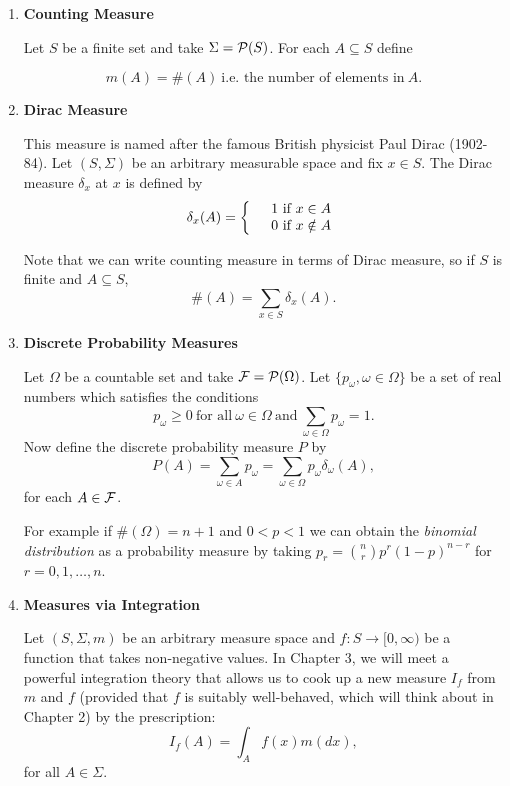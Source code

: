 \documentclass[a4paper]{report}
\numberwithin{equation}{chapter}
\numberwithin{thm_counter}{section}
\begin{document}
\begin{enumerate}

\item {\bf Counting Measure}

 

Let $S$ be a finite set and take $\Sigma = {\cal P}(S)$. For each $A \subseteq S$ define

$$ m(A) = \#(A)~\mbox{i.e. the number of elements in}~A.$$

 

\item  {\bf Dirac Measure}

 

This measure is named after the famous British physicist Paul Dirac (1902-84). Let $(S, \Sigma)$ be an arbitrary measurable space and fix $x \in S$. The Dirac measure $\delta_{x}$ at $x$ is defined by
$$ \delta_{x}(A) = \left\{\begin{array}{c c}  & 1 ~\mbox{if}~x \in A\\
 & 0 ~\mbox{if}~ x \notin A \end{array} \right.$$

 Note that we can write counting measure in terms of Dirac measure, so if $S$ is finite and $A \subseteq S$,
 $$ \#(A) = \sum_{x \in S}\delta_{x}(A).$$


 

\item  {\bf Discrete Probability Measures}

 

Let $\Omega$ be a countable set and take ${\cal F} = {\cal P}(\Omega)$. Let $\{p_{\omega}, \omega \in \Omega\}$ be a set of real numbers which satisfies the conditions
$$ p_{\omega} \geq 0~\mbox{for all}~\omega \in \Omega~\mbox{and}~\sum_{\omega \in \Omega}p_{\omega} = 1.$$
Now define the discrete probability measure $P$ by
$$ P(A) = \sum_{\omega \in A}p_{\omega} = \sum_{\omega \in \Omega}p_{\omega}\delta_{\omega}(A),$$
for each $A \in {\cal F}$.

For example if $\#(\Omega) = n+1$ and $0 < p < 1$ we can obtain the {\it binomial distribution} as a probability measure by taking $p_{r} = {n \choose r}p^{r}(1-p)^{n-r}$ for $r = 0, 1, \ldots, n$.

 

\item  {\bf Measures via Integration}

 

Let $(S, \Sigma, m)$ be an arbitrary measure space and $f:S \rightarrow [0, \infty)$ be a function that takes non-negative values. In Chapter 3, we will meet a powerful integration theory that allows us to cook up a new measure $I_{f}$ from $m$ and $f$ (provided that $f$ is suitably well-behaved, which will think about in Chapter 2) by the prescription:
$$ I_{f}(A) = \int_{A}f(x)m(dx),$$ for all $A \in \Sigma$.

\end{enumerate}
\end{document}
